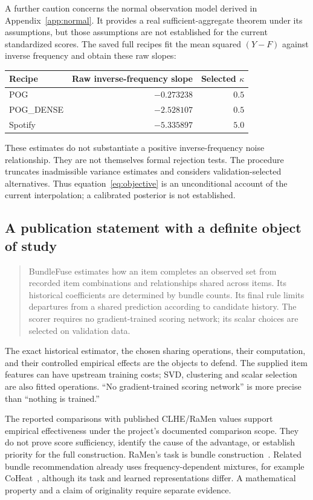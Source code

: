 \documentclass[11pt,a4paper]{article}
\begin{document}
A further caution concerns the normal observation model derived in
Appendix~\ref{app:normal}. It provides a real sufficient-aggregate theorem
under its assumptions, but those assumptions are not established for the
current standardized scores. The saved full recipes fit the mean squared
$(Y-F)$ against inverse frequency and obtain these raw slopes:
\begin{center}
\begin{tabular}{@{}lrr@{}}
\toprule
Recipe & Raw inverse-frequency slope & Selected $\kappa$\\
\midrule
POG & $-0.273238$ & $0.5$\\
POG\_DENSE & $-2.528107$ & $0.5$\\
Spotify & $-5.335897$ & $5.0$\\
\bottomrule
\end{tabular}
\end{center}
These estimates do not substantiate a positive inverse-frequency noise
relationship. They are not themselves formal rejection tests. The procedure
truncates inadmissible variance estimates and considers validation-selected
alternatives. Thus equation~\eqref{eq:objective} is an unconditional account
of the current interpolation; a calibrated posterior is not established.

\subsection{A publication statement with a definite object of study}

\begin{quote}
BundleFuse estimates how an item completes an observed set from recorded
item combinations and relationships shared across items. Its historical
coefficients are determined by bundle counts. Its final rule limits
departures from a shared prediction according to candidate history. The
scorer requires no gradient-trained scoring network; its scalar choices are
selected on validation data.
\end{quote}

The exact historical estimator, the chosen sharing operations, their
computation, and their controlled empirical effects are the objects to
defend. The supplied item features can have upstream training costs; SVD,
clustering and scalar selection are also fitted operations. ``No
gradient-trained scoring network'' is more precise than ``nothing is
trained.''

The reported comparisons with published CLHE/RaMen values support empirical
effectiveness under the project's documented comparison scope. They do not
prove score sufficiency, identify the cause of the advantage, or establish
priority for the full construction. RaMen's task is bundle
construction~\cite{ramen2025}. Related bundle recommendation already uses
frequency-dependent mixtures, for example CoHeat~\cite{coheat2024},
although its task and learned representations differ. A mathematical
property and a claim of originality require separate evidence.
\end{document}
